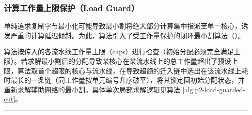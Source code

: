 \documentclass[anonymous,withtoc]{gmcm2026}
\begin{document}
\subsubsection{计算工作量上限保护（Load Guard）}

单纯追求复制字节最小化可能导致最小割将绝大部分计算集中指派至单一核心，诱发严重的计算延迟倾斜。为此，算法引入了受工作量保护的闭环最小割算法（\texttt{}）。

算法按传入的各流水线工作量上限（caps）进行检查（初始分配必须完全满足上限）。若求解最小割后的分配导致某核心在某流水线上的总工作量超出了预设上限，算法取首个超限的核心与流水线，在导致超额的迁入链中选出在该流水线上耗时最长的一条链（同工作量按单元编号升序破平），将其锁定回初始分配状态，并重新求解辅助网络的最小割。具体单次局部求解逻辑见算法 \ref{alg:p2-load-guarded-cut}。

\FloatBarrier
\par{}\begingroup\normalsize
\captionsetup{type=algorithm,position=top,justification=raggedright,singlelinecheck=false,labelfont=bf}
\label{alg:p2-load-guarded-cut}
\nopagebreak\hrule\nopagebreak
\end{document}
